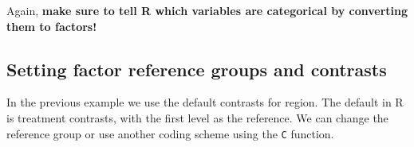 \documentclass[]{book}
\newenvironment{Shaded}{\begin{snugshade}}{\end{snugshade}}
\newcommand{\KeywordTok}[1]{\textcolor[rgb]{0.13,0.29,0.53}{\textbf{#1}}}
\newcommand{\DataTypeTok}[1]{\textcolor[rgb]{0.13,0.29,0.53}{#1}}
\newcommand{\StringTok}[1]{\textcolor[rgb]{0.31,0.60,0.02}{#1}}
\newcommand{\CommentTok}[1]{\textcolor[rgb]{0.56,0.35,0.01}{\textit{#1}}}
\newcommand{\OperatorTok}[1]{\textcolor[rgb]{0.81,0.36,0.00}{\textbf{#1}}}
\newcommand{\NormalTok}[1]{#1}
\begin{document}
\begin{Shaded}
\end{Shaded}

Again, \textbf{make sure to tell R which variables are categorical by
converting them to factors!}

\subsection{Setting factor reference groups and
contrasts}\label{setting-factor-reference-groups-and-contrasts}

In the previous example we use the default contrasts for region. The
default in R is treatment contrasts, with the first level as the
reference. We can change the reference group or use another coding
scheme using the \texttt{C} function.
\end{document}
